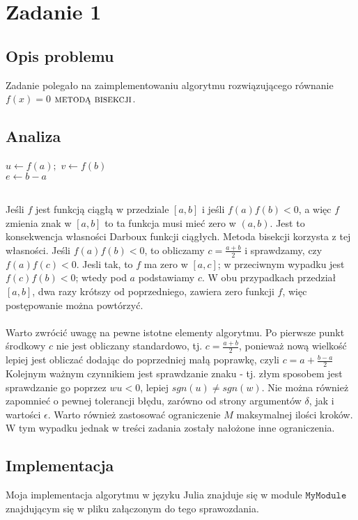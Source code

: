 \section{Zadanie 1}
\subsection{Opis problemu}
Zadanie polegało na zaimplementowaniu algorytmu rozwiązującego równanie $ f(x) = 0 $ $\textsc{metodą bisekcji} $.
\subsection{Analiza}
\begin{algorithm}[H]
  $u \leftarrow f(a);$ $ v \leftarrow f(b) $ \\
  $e \leftarrow b - a $ \\
\end{algorithm}

\ \\
Jeśli $f$ jest funkcją ciągłą w przedziale $[a, b]$ i jeśli $f(a)f(b) < 0$, a więc $ f $ zmienia znak w $ [a, b] $ to ta funkcja musi mieć zero w $(a, b)$. Jest to konsekwencja własności Darboux funkcji ciągłych. Metoda bisekcji korzysta z tej własności. Jeśli $ f(a)f(b) < 0 $, to obliczamy $c = \frac{a + b}{2}$ i sprawdzamy, czy $f(a)f(c) < 0 $. Jesli tak, to $f$ ma zero w $[a, c]$; w przeciwnym wypadku jest $f(c)f(b) < 0$; wtedy pod $a$ podstawiamy $c$. W obu przypadkach przedział $[a, b]$, dwa razy krótszy od poprzedniego, zawiera zero funkcji $f$, więc postępowanie można powtórzyć.\\\\
Warto zwrócić uwagę na pewne istotne elementy algorytmu. Po pierwsze punkt środkowy $ c $ nie jest obliczany standardowo, tj. $ c = \frac{a + b}{2} $, ponieważ nową wielkość lepiej jest obliczać dodając do poprzedniej małą poprawkę, czyli $ c = a + \frac{b - a}{2} $ Kolejnym ważnym czynnikiem jest sprawdzanie znaku - tj. złym sposobem jest sprawdzanie go poprzez $ wu < 0 $, lepiej $sgn(u) \neq sgn(w) $. Nie można również zapomnieć o pewnej tolerancji błędu, zarówno od strony argumentów $\delta$, jak i wartości $\epsilon$. Warto również zastosować ograniczenie $ M $ maksymalnej ilości kroków. W tym wypadku jednak w treści zadania zostały nałożone inne ograniczenia.


\subsection{Implementacja}
Moja implementacja algorytmu w języku Julia znajduje się w module $ \texttt{MyModule} $ znajdującym się w pliku załączonym do tego sprawozdania. 